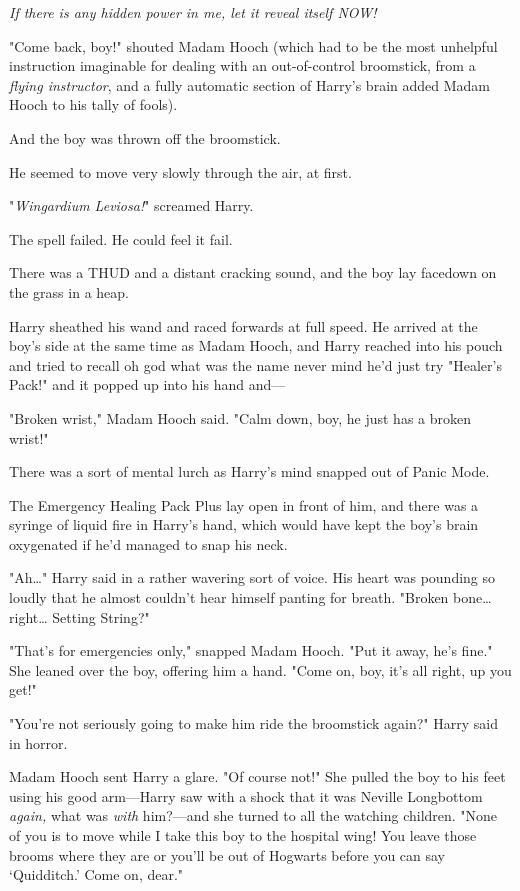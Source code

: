 \emph{If there is any hidden power in me, let it reveal itself NOW!}

"Come back, boy!" shouted Madam Hooch (which had to be the most unhelpful
instruction imaginable for dealing with an out-of-control broomstick, from a
\emph{flying instructor}, and a fully automatic section of Harry's brain added
Madam Hooch to his tally of fools).

And the boy was thrown off the broomstick.

He seemed to move very slowly through the air, at first.

"\emph{Wingardium Leviosa!}" screamed Harry.

The spell failed. He could feel it fail.

There was a THUD and a distant cracking sound, and the boy lay facedown on the
grass in a heap.

Harry sheathed his wand and raced forwards at full speed. He arrived at the
boy's side at the same time as Madam Hooch, and Harry reached into his pouch
and tried to recall oh god what was the name never mind he'd just try "Healer's
Pack!" and it popped up into his hand and---

"Broken wrist," Madam Hooch said. "Calm down, boy, he just has a broken wrist!"

There was a sort of mental lurch as Harry's mind snapped out of Panic Mode.

The Emergency Healing Pack Plus lay open in front of him, and there was a
syringe of liquid fire in Harry's hand, which would have kept the boy's brain
oxygenated if he'd managed to snap his neck.

"Ah{\ldots}" Harry said in a rather wavering sort of voice. His heart was
pounding so loudly that he almost couldn't hear himself panting for breath.
"Broken bone{\ldots} right{\ldots} Setting String?"

"That's for emergencies only," snapped Madam Hooch. "Put it away, he's fine."
She leaned over the boy, offering him a hand. "Come on, boy, it's all right, up
you get!"

"You're not seriously going to make him ride the broomstick again?" Harry said
in horror.

Madam Hooch sent Harry a glare. "Of course not!" She pulled the boy to his feet
using his good arm---Harry saw with a shock that it was Neville Longbottom
\emph{again,} what was \emph{with} him?---and she turned to all the watching
children. "None of you is to move while I take this boy to the hospital wing!
You leave those brooms where they are or you'll be out of Hogwarts before you
can say `Quidditch.' Come on, dear."

